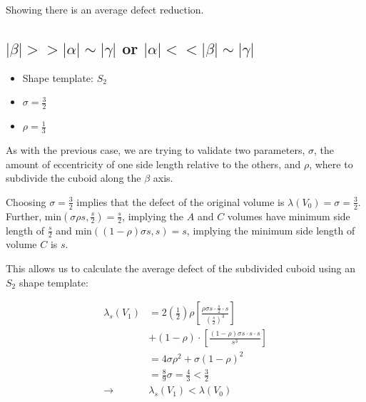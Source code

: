 Showing there is an average defect reduction.

\subsection{$|\beta| >> |\alpha| \sim |\gamma|$ or $|\alpha| << |\beta| \sim |\gamma|$}

\begin{itemize}
  \item Shape template: $S_2$
  \item $\sigma = \frac{3}{2}$
  \item $\rho = \frac{1}{3}$
\end{itemize}

As with the previous case, we are trying to validate two parameters, $\sigma$, the amount
of eccentricity of one side length relative to the others, and $\rho$, where to subdivide the
cuboid along the $\beta$ axis.

Choosing $\sigma = \frac{3}{2}$ implies that the defect of the original volume is $\lambda(V_0) = \sigma = \frac{3}{2}$.
Further, $\text{min}( \sigma \rho s, \frac{s}{2} ) = \frac{s}{2}$, implying the $A$ and $C$ volumes
have minimum side length of $\frac{s}{2}$ and $\text{min}( (1-\rho) \sigma s, s) = s$, implying the
minimum side length of volume $C$ is $s$.

This allows us to calculate the average defect of the subdivided cuboid using an $S_2$ shape template:

$$
\begin{array}{ll}
  \lambda_s (V_1) & = 2 (\frac{1}{2}) \rho [ \frac{ \rho \sigma s \cdot \frac{s}{2} \cdot s }{(\frac{s}{2})^3} ] \\
  & + (1-\rho) \cdot [ \frac{ (1-\rho) \sigma s \cdot s \cdot s }{s^3} ] \\
  & = 4 \sigma \rho^2 + \sigma (1-\rho)^2 \\
  & = \frac{8}{9} \sigma = \frac{4}{3} < \frac{3}{2} \\
  \to & \lambda_s(V_1) < \lambda(V_0) \\
\end{array}
$$


